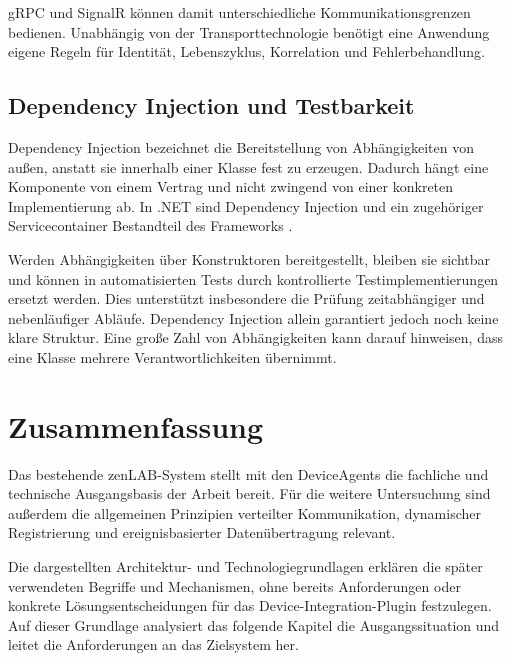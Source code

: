 gRPC und SignalR können damit unterschiedliche Kommunikationsgrenzen bedienen. Unabhängig von der Transporttechnologie benötigt eine Anwendung eigene Regeln für Identität, Lebenszyklus, Korrelation und Fehlerbehandlung.

\subsection{Dependency Injection und Testbarkeit}

Dependency Injection bezeichnet die Bereitstellung von Abhängigkeiten von außen, anstatt sie innerhalb einer Klasse fest zu erzeugen. Dadurch hängt eine Komponente von einem Vertrag und nicht zwingend von einer konkreten Implementierung ab. In .NET sind Dependency Injection und ein zugehöriger Servicecontainer Bestandteil des Frameworks \cite{microsoftDependencyInjection}.

Werden Abhängigkeiten über Konstruktoren bereitgestellt, bleiben sie sichtbar und können in automatisierten Tests durch kontrollierte Testimplementierungen ersetzt werden. Dies unterstützt insbesondere die Prüfung zeitabhängiger und nebenläufiger Abläufe. Dependency Injection allein garantiert jedoch noch keine klare Struktur. Eine große Zahl von Abhängigkeiten kann darauf hinweisen, dass eine Klasse mehrere Verantwortlichkeiten übernimmt.

\section{Zusammenfassung}

Das bestehende zenLAB-System stellt mit den DeviceAgents die fachliche und technische Ausgangsbasis der Arbeit bereit. Für die weitere Untersuchung sind außerdem die allgemeinen Prinzipien verteilter Kommunikation, dynamischer Registrierung und ereignisbasierter Datenübertragung relevant.

Die dargestellten Architektur- und Technologiegrundlagen erklären die später verwendeten Begriffe und Mechanismen, ohne bereits Anforderungen oder konkrete Lösungsentscheidungen für das Device-Integration-Plugin festzulegen. Auf dieser Grundlage analysiert das folgende Kapitel die Ausgangssituation und leitet die Anforderungen an das Zielsystem her.
